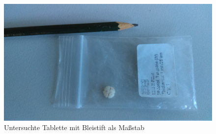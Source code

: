 \documentclass[a4paper,14pt]{article}
\begin{document}
\begin{figure}[H]
\centering
\includegraphics[width=\textwidth]{../Photos/Pille.jpg}
\caption{Untersuchte Tablette mit Bleistift als Maßstab}
\label{Pille}
\end{figure}
\end{document}
